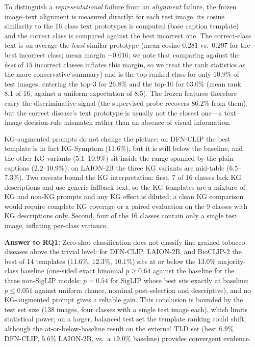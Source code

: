 \documentclass[10pt,a4paper]{article}
\begin{document}
To distinguish a \emph{representational} failure from an \emph{alignment} failure, the frozen image--text alignment is measured directly: for each test image, its cosine similarity to the 16 class text prototypes is computed (base caption template) and the correct class is compared against the best incorrect one. The correct-class text is on average the \emph{least} similar prototype (mean cosine $0.281$ vs.\ $0.297$ for the best incorrect class; mean margin $-0.016$; we note that comparing against the \emph{best} of $15$ incorrect classes inflates this margin, so we treat the rank statistics as the more conservative summary) and is the top-ranked class for only $10.9\%$ of test images, entering the top-3 for $26.8\%$ and the top-10 for $63.0\%$ (mean rank $8.1$ of $16$, against a uniform expectation of $8.5$). The frozen features therefore carry the discriminative signal (the supervised probe recovers $86.2\%$ from them), but the correct disease's text prototype is usually not the closest one---a text--image decision-rule mismatch rather than an absence of visual information.

KG-augmented prompts do not change the picture: on DFN-CLIP the best template is in fact KG-Symptom (11.6\%), but it is still below the baseline, and the other KG variants (5.1--10.9\%) sit inside the range spanned by the plain captions (2.2--10.9\%); on LAION-2B the three KG variants are mid-table (6.5--7.3\%).
Two caveats bound the KG interpretation: first, 7 of 16 classes lack KG descriptions and use generic fallback text, so the KG templates are a mixture of KG and non-KG prompts and any KG effect is diluted; a clean KG comparison would require complete KG coverage or a paired evaluation on the 9 classes with KG descriptions only.
Second, four of the 16 classes contain only a single test image, inflating per-class variance.

\textbf{Answer to RQ1:} Zero-shot classification does not classify fine-grained tobacco diseases above the trivial level: for DFN-CLIP, LAION-2B, and BioCLIP-2 the best of 14 templates ($11.6\%$, $12.3\%$, $10.1\%$) sits at or below the 13.0\% majority-class baseline (one-sided exact binomial $p\geq0.64$ against the baseline for the three non-SigLIP models; $p{=}0.54$ for SigLIP whose best sits exactly at baseline; $p\leq0.051$ against uniform chance, nominal post-selection and descriptive), and no KG-augmented prompt gives a reliable gain. This conclusion is bounded by the test set size (138 images, four classes with a single test image each), which limits statistical power; on a larger, balanced test set the template ranking could shift, although the at-or-below-baseline result on the external TLD set (best $6.9\%$ DFN-CLIP, $5.6\%$ LAION-2B, vs.\ a $19.0\%$ baseline) provides convergent evidence.
\end{document}
